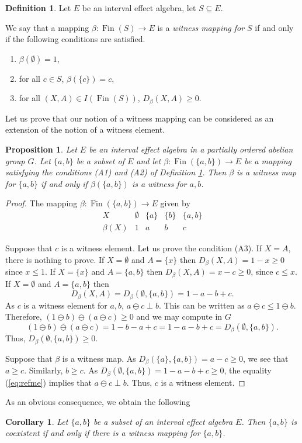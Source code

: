 \documentclass[letterpaper]{amsart}
\newtheorem{corollary}{Corollary}
\newtheorem{proposition}{Proposition}
\theoremstyle{definition}
\newtheorem{definition}{Definition}
\DeclareMathOperator*\Fin{Fin}
\begin{document}
\begin{definition}\label{def:cm}
Let $E$ be an interval effect algebra, let $S\subseteq E$.

We say that a mapping $\beta:\Fin(S)\to E$ is a {\em witness
mapping for $S$} if and only if the following conditions are satisfied.
\begin{enumerate}
\item[(A1)]$\beta(\emptyset)=1$,
\item[(A2)]for all $c\in S$, $\beta(\{c\})=c$,
\item[(A3)]for all $(X,A)\in I(\Fin(S))$, $D_\beta(X,A)\geq 0$.
\end{enumerate}
\end{definition}

Let us prove that our notion of a witness mapping can be considered as an extension
of the notion of a witness element.

\begin{proposition}
Let $E$ be an interval effect algebra in a partially ordered abelian group $G$.
Let $\{a,b\}$ be a subset of $E$ and let $\beta:\Fin(\{a,b\})\to E$
be a mapping satisfying the conditions (A1) and (A2) of Definition \ref{def:cm}.
Then $\beta$ is a witness map for $\{a,b\}$ if and only if $\beta(\{a,b\})$ 
is a witness for $a,b$.
\end{proposition}
\begin{proof}
The mapping $\beta:\Fin(\{a,b\})\to E$ given by
$$
\begin{array}{c|c|c|c|c}
X & \emptyset & \{a\} & \{b\} & \{a,b\}\\
\hline
\beta(X) & 1 & a & b & c 
\end{array}
$$

Suppose that $c$ is a witness element.
Let us prove the condition (A3).
If $X=A$, there is nothing to prove. If $X=\emptyset$ and $A=\{x\}$ then
$D_\beta(X,A)=1-x\geq 0$ since $x\leq 1$. If $X=\{x\}$ and $A=\{a,b\}$ then
$D_\beta(X,A)=x-c\geq 0$, since $c\leq x$. If $X=\emptyset$ and $A=\{a,b\}$
then
$$
D_\beta(X,A)=D_\beta(\emptyset,\{a,b\})=
1-a-b+c.
$$
As $c$ is a witness element for $a,b$, $a\ominus c\perp b$. This can be written
as $a\ominus c\leq 1\ominus b$. Therefore, $(1\ominus b)\ominus (a\ominus c)\geq 0$ and
we may compute in $G$
\begin{equation}\label{eq:refme}
(1\ominus b)\ominus(a\ominus c)=1-b-a+c=1-a-b+c=D_\beta(\emptyset,\{a,b\}).
\end{equation}
Thus, $D_\beta(\emptyset,\{a,b\})\geq 0$.

Suppose that $\beta$ is a witness map.
As $D_\beta(\{a\},\{a,b\})=a-c\geq 0$, we see that $a\geq c$. Similarly, $b\geq c$.
As $D_\beta(\emptyset,\{a,b\})=1-a-b+c\geq 0$,
the equality (\ref{eq:refme}) implies that $a\ominus c\perp b$. Thus, $c$ is a witness
element.
\end{proof}
As an obvious consequence, we obtain the following
\begin{corollary}
Let $\{a,b\}$ be a subset of an interval effect algebra $E$.
Then $\{a,b\}$ is coexistent if and only if there is a witness mapping for $\{a,b\}$.
\end{corollary}
\end{document}
